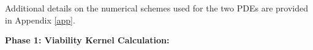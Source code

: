 \documentclass[]{interact}
\theoremstyle{plain}%
\theoremstyle{definition}
\theoremstyle{remark}
\begin{document}
Additional details on the numerical schemes used for the two PDEs are provided in Appendix \ref{app}.






\textbf{Phase 1: Viability Kernel Calculation:}\\
\end{document}
